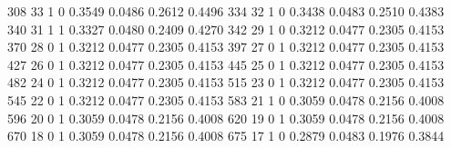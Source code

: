 \documentclass[
  12pt,
  letterpaper,
  DIV=11,
  numbers=noendperiod,
  onepage,
  openany]{scrreprt}
\newenvironment{Shaded}{\begin{snugshade}}{\end{snugshade}}
\newcommand{\DecValTok}[1]{\textcolor[rgb]{0.86,0.86,0.80}{#1}}
\newcommand{\FloatTok}[1]{\textcolor[rgb]{0.75,0.75,0.82}{#1}}
\begin{document}
\begin{Shaded}
\begin{Highlighting}[]
   \DecValTok{308}       \DecValTok{33}      \DecValTok{1}      \DecValTok{0}             \FloatTok{0.3549}    \FloatTok{0.0486}     \FloatTok{0.2612}    \FloatTok{0.4496}
   \DecValTok{334}       \DecValTok{32}      \DecValTok{1}      \DecValTok{0}             \FloatTok{0.3438}    \FloatTok{0.0483}     \FloatTok{0.2510}    \FloatTok{0.4383}
   \DecValTok{340}       \DecValTok{31}      \DecValTok{1}      \DecValTok{1}             \FloatTok{0.3327}    \FloatTok{0.0480}     \FloatTok{0.2409}    \FloatTok{0.4270}
   \DecValTok{342}       \DecValTok{29}      \DecValTok{1}      \DecValTok{0}             \FloatTok{0.3212}    \FloatTok{0.0477}     \FloatTok{0.2305}    \FloatTok{0.4153}
   \DecValTok{370}       \DecValTok{28}      \DecValTok{0}      \DecValTok{1}             \FloatTok{0.3212}    \FloatTok{0.0477}     \FloatTok{0.2305}    \FloatTok{0.4153}
   \DecValTok{397}       \DecValTok{27}      \DecValTok{0}      \DecValTok{1}             \FloatTok{0.3212}    \FloatTok{0.0477}     \FloatTok{0.2305}    \FloatTok{0.4153}
   \DecValTok{427}       \DecValTok{26}      \DecValTok{0}      \DecValTok{1}             \FloatTok{0.3212}    \FloatTok{0.0477}     \FloatTok{0.2305}    \FloatTok{0.4153}
   \DecValTok{445}       \DecValTok{25}      \DecValTok{0}      \DecValTok{1}             \FloatTok{0.3212}    \FloatTok{0.0477}     \FloatTok{0.2305}    \FloatTok{0.4153}
   \DecValTok{482}       \DecValTok{24}      \DecValTok{0}      \DecValTok{1}             \FloatTok{0.3212}    \FloatTok{0.0477}     \FloatTok{0.2305}    \FloatTok{0.4153}
   \DecValTok{515}       \DecValTok{23}      \DecValTok{0}      \DecValTok{1}             \FloatTok{0.3212}    \FloatTok{0.0477}     \FloatTok{0.2305}    \FloatTok{0.4153}
   \DecValTok{545}       \DecValTok{22}      \DecValTok{0}      \DecValTok{1}             \FloatTok{0.3212}    \FloatTok{0.0477}     \FloatTok{0.2305}    \FloatTok{0.4153}
   \DecValTok{583}       \DecValTok{21}      \DecValTok{1}      \DecValTok{0}             \FloatTok{0.3059}    \FloatTok{0.0478}     \FloatTok{0.2156}    \FloatTok{0.4008}
   \DecValTok{596}       \DecValTok{20}      \DecValTok{0}      \DecValTok{1}             \FloatTok{0.3059}    \FloatTok{0.0478}     \FloatTok{0.2156}    \FloatTok{0.4008}
   \DecValTok{620}       \DecValTok{19}      \DecValTok{0}      \DecValTok{1}             \FloatTok{0.3059}    \FloatTok{0.0478}     \FloatTok{0.2156}    \FloatTok{0.4008}
   \DecValTok{670}       \DecValTok{18}      \DecValTok{0}      \DecValTok{1}             \FloatTok{0.3059}    \FloatTok{0.0478}     \FloatTok{0.2156}    \FloatTok{0.4008}
   \DecValTok{675}       \DecValTok{17}      \DecValTok{1}      \DecValTok{0}             \FloatTok{0.2879}    \FloatTok{0.0483}     \FloatTok{0.1976}    \FloatTok{0.3844}

\end{Highlighting}
\end{Shaded}
\end{document}
